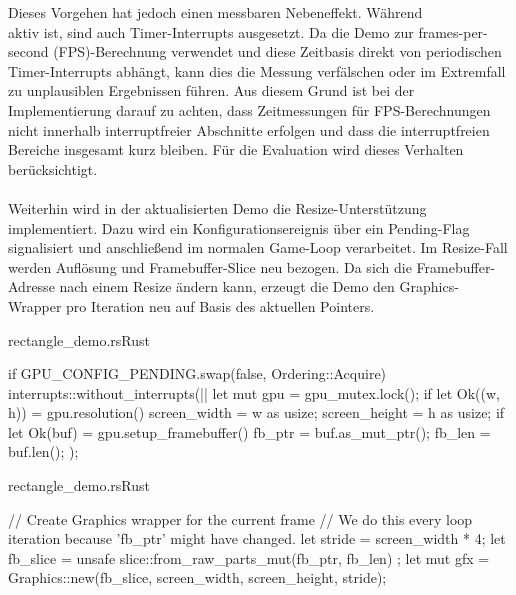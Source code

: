 Dieses Vorgehen hat jedoch einen messbaren Nebeneffekt. Während \\  aktiv ist, sind auch Timer-Interrupts ausgesetzt. Da die Demo zur frames-per-second (FPS)-Berechnung  verwendet und diese Zeitbasis direkt von periodischen Timer-Interrupts abhängt, kann dies die Messung verfälschen oder im Extremfall zu unplausiblen Ergebnissen führen. Aus diesem Grund ist bei der Implementierung darauf zu achten, dass Zeitmessungen für FPS-Berechnungen nicht innerhalb interruptfreier Abschnitte erfolgen und dass die interruptfreien Bereiche insgesamt kurz bleiben. Für die Evaluation wird dieses Verhalten berücksichtigt.\\
\\
Weiterhin wird in der aktualisierten Demo die Resize-Unterstützung implementiert. Dazu wird ein Konfigurationsereignis über ein Pending-Flag signalisiert und anschließend im normalen Game-Loop verarbeitet. Im Resize-Fall werden Auflösung und Framebuffer-Slice neu bezogen. Da sich die Framebuffer-Adresse nach einem Resize ändern kann, erzeugt die Demo den Graphics-Wrapper pro Iteration neu auf Basis des aktuellen Pointers.

\begin{codeblock}{rectangle\_demo.rs}{Rust}
  \begin{rustcode}
if GPU_CONFIG_PENDING.swap(false, Ordering::Acquire) {
    interrupts::without_interrupts(|| {
        let mut gpu = gpu_mutex.lock();
        if let Ok((w, h)) = gpu.resolution() {
            screen_width = w as usize;
            screen_height = h as usize;
        }
        if let Ok(buf) = gpu.setup_framebuffer() {
            fb_ptr = buf.as_mut_ptr();
            fb_len = buf.len();
        }
    });
}
  \end{rustcode}
\end{codeblock}

\begin{codeblock}{rectangle\_demo.rs}{Rust}
  \begin{rustcode}
// Create Graphics wrapper for the current frame
// We do this every loop iteration because 'fb_ptr' might have changed.
let stride = screen_width * 4;
let fb_slice = unsafe { slice::from_raw_parts_mut(fb_ptr, fb_len) };
let mut gfx = Graphics::new(fb_slice, screen_width, screen_height, stride);
  \end{rustcode}
\end{codeblock}

